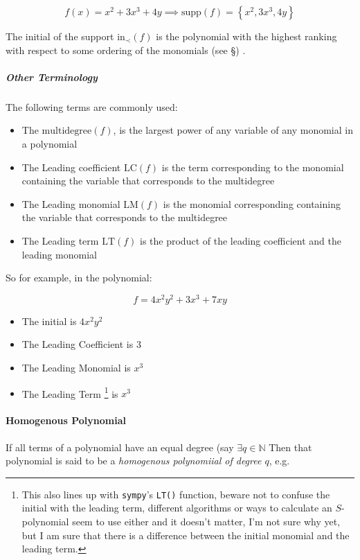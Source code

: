 \documentclass[a4paper,11pt,twoside]{article}
\begin{document}
\[
     f(x) = x^2+3x^3+4y \implies \mathrm{supp}\left(f\right) =
     \left\{x^2, 3x^3, 4y\right\}
     \]

The initial of the support \(\mathrm{in}_{\prec}\left(f\right)\)
is the polynomial with the highest ranking with respect to some
ordering of the monomials (see \S ) \cite[1.1.5]{hibiGrobnerBasesStatistics2014}.



\subparagraph{Other Terminology}
\label{sec:org9c0cd59}

The following terms are commonly used: \cite[\S 2.2]{coxIdealsVarietiesAlgorithms1997}

\begin{itemize}
\item The \(\mathrm{multidegree}\left(f\right)\), is the
largest power of any variable of any monomial in a polynomial
\item The Leading coefficient \(\mathrm{LC}\left(f\right)\) is the
term corresponding to the monomial containing the variable
that corresponds to the multidegree
\item The Leading monomial \(\mathrm{LM}\left(f\right)\) is the
monomial corresponding containing the variable
that corresponds to the multidegree
\item The Leading term \(\mathrm{LT}\left(f\right)\) is the product
of the leading coefficient and the leading monomial
\end{itemize}

So for example, in the polynomial:

\[
	f= 4x^2y^2 + 3x^3 + 7xy
	\]

\begin{itemize}
\item The initial is \(4x^2y^2\)
\item The Leading Coefficient is 3
\item The Leading Monomial is \(x^3\)
\item The Leading Term \footnote{This also lines up with \texttt{sympy}'s \texttt{LT()} function, beware not to
confuse the initial with the leading term, different algorithms or
ways to calculate an \(S\)-polynomial seem to use either and it
doesn't matter, I'm not sure why yet, but I am sure that there is a
difference between the initial monomial and the leading term.} is \(x^3\)
\end{itemize}




\paragraph{Homogenous Polynomial}
\label{sec:org6f45654}
If all terms of a polynomial have an equal degree (say \(\exists q
     \in \mathbb{N}\) Then that polynomial is said to be a \emph{homogenous
polynomiial of degree \(q\)}, e.g.
\end{document}
